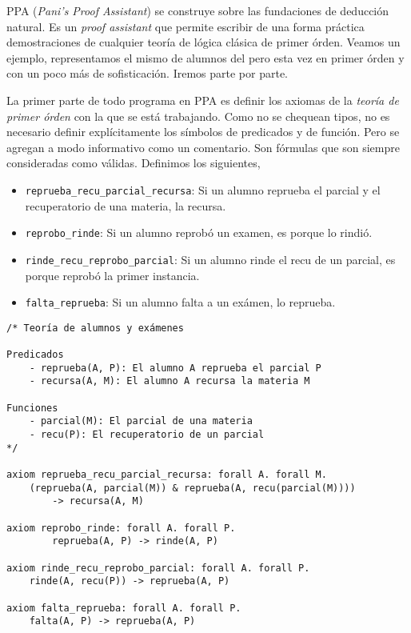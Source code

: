 PPA (\textit{Pani's Proof Assistant}) se construye sobre las fundaciones de
deducción natural. Es un \textit{proof assistant} que permite escribir de una
forma práctica demostraciones de cualquier teoría de lógica clásica de primer
órden. Veamos un ejemplo, representamos el mismo de alumnos del
 pero esta vez en primer órden y con un poco más de sofisticación. Iremos parte por parte.


La primer parte de todo programa en PPA es definir los axiomas de la
\textit{teoría de primer órden} con la que se está trabajando. Como no se
chequean tipos, no es necesario definir explícitamente los símbolos de
predicados y de función. Pero se agregan a modo informativo como un comentario.
Son fórmulas que son siempre consideradas como válidas. Definimos los siguientes,
\begin{itemize}
    \item \texttt{reprueba\_recu\_parcial\_recursa}: Si un alumno reprueba el
    parcial y el recuperatorio de una materia, la recursa.
    \item \texttt{reprobo\_rinde}: Si un alumno reprobó un examen, es porque lo
    rindió.
    \item \texttt{rinde\_recu\_reprobo\_parcial}: Si un alumno rinde el recu de
    un parcial, es porque reprobó la primer instancia.
    \item \texttt{falta\_reprueba}: Si un alumno falta a un exámen, lo reprueba.
\end{itemize}

\begin{lstlisting}[language=PPA]
/* Teoría de alumnos y exámenes

Predicados
    - reprueba(A, P): El alumno A reprueba el parcial P
    - recursa(A, M): El alumno A recursa la materia M

Funciones
    - parcial(M): El parcial de una materia
    - recu(P): El recuperatorio de un parcial
*/

axiom reprueba_recu_parcial_recursa: forall A. forall M.
    (reprueba(A, parcial(M)) & reprueba(A, recu(parcial(M))))
        -> recursa(A, M)

axiom reprobo_rinde: forall A. forall P.
        reprueba(A, P) -> rinde(A, P)

axiom rinde_recu_reprobo_parcial: forall A. forall P.
    rinde(A, recu(P)) -> reprueba(A, P)

axiom falta_reprueba: forall A. forall P.
    falta(A, P) -> reprueba(A, P)
\end{lstlisting}

